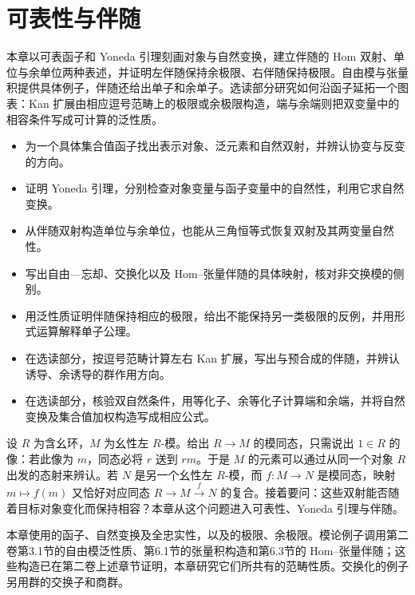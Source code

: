 
\chapter{可表性与伴随}
\label{b4:ch:03}

\begin{chapterabstract}
	本章以可表函子和 Yoneda 引理刻画对象与自然变换，建立伴随的 Hom 双射、单位与余单位两种表述，并证明左伴随保持余极限、右伴随保持极限。自由模与张量积提供具体例子，伴随还给出单子和余单子。选读部分研究如何沿函子延拓一个图表：Kan 扩展由相应逗号范畴上的极限或余极限构造，端与余端则把双变量中的相容条件写成可计算的泛性质。
\end{chapterabstract}

\begin{learninggoals}
	\begin{itemize}
		\item 为一个具体集合值函子找出表示对象、泛元素和自然双射，并辨认协变与反变的方向。
		\item 证明 Yoneda 引理，分别检查对象变量与函子变量中的自然性，利用它求自然变换。
		\item 从伴随双射构造单位与余单位，也能从三角恒等式恢复双射及其两变量自然性。
		\item 写出自由—忘却、交换化以及 Hom–张量伴随的具体映射，核对非交换模的侧别。
		\item 用泛性质证明伴随保持相应的极限，给出不能保持另一类极限的反例，并用形式运算解释单子公理。
		\item 在选读部分，按逗号范畴计算左右 Kan 扩展，写出与预合成的伴随，并辨认诱导、余诱导的群作用方向。
		\item 在选读部分，核验双自然条件，用等化子、余等化子计算端和余端，并将自然变换及集合值加权构造写成相应公式。
	\end{itemize}
\end{learninggoals}

设 \(R\) 为含幺环，\(M\) 为幺性左 \(R\)-模。给出 \(R\rightarrow M\) 的模同态，只需说出 \(1\in R\) 的像：若此像为 \(m\)，同态必将 \(r\) 送到 \(rm\)。于是 \(M\) 的元素可以通过从同一个对象 \(R\) 出发的态射来辨认。若 \(N\) 是另一个幺性左 \(R\)-模，而 \(f:M\rightarrow N\) 是模同态，映射 \(m\mapsto f(m)\) 又恰好对应同态 \(R\rightarrow M\xrightarrow{f}N\) 的复合。接着要问：这些双射能否随着目标对象变化而保持相容？本章从这个问题进入可表性、Yoneda 引理与伴随。

\ProseParagraphBreak
本章使用的函子、自然变换及全忠实性，以及的极限、余极限。模论例子调用第二卷第3.1节的自由模泛性质、第6.1节的张量积构造和第6.3节的 Hom–张量伴随；这些构造已在第二卷上述章节证明，本章研究它们所共有的范畴性质。交换化的例子另用群的交换子和商群。

